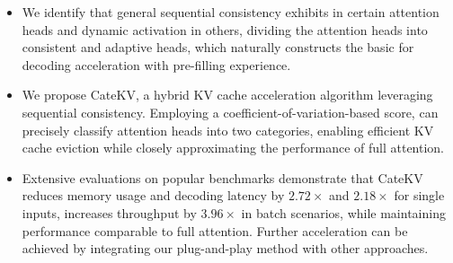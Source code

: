 \begin{itemize}
\item We identify that general sequential consistency exhibits in certain attention heads and dynamic activation in others, dividing the attention heads into consistent and adaptive heads, which naturally constructs the basic for decoding acceleration with pre-filling experience.
\item We propose CateKV, a hybrid KV cache acceleration algorithm leveraging sequential consistency. 
Employing a coefficient-of-variation-based score, \shortname can precisely classify attention heads into two categories, enabling efficient KV cache eviction while closely approximating the performance of full attention.
\item Extensive evaluations on popular benchmarks demonstrate that CateKV reduces memory usage and decoding latency by $2.72\times$ and $2.18\times$ for single inputs, increases throughput by $3.96\times$ in batch scenarios, while maintaining performance comparable to full attention.
Further acceleration can be achieved by integrating our plug-and-play method with other approaches.


\end{itemize}
